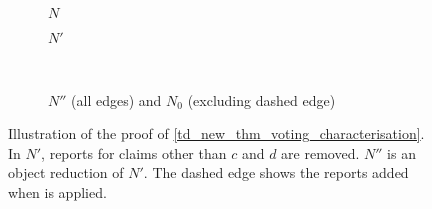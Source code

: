 \begin{figure}
    \centering
    \begin{subfigure}{.4\textwidth}
        \centering
        \caption{$N$}
    \end{subfigure}
    \begin{subfigure}{.4\textwidth}
        \centering
        \caption{$N'$}
    \end{subfigure}
    \\
    \begin{subfigure}{.9\textwidth}
        \centering
        \caption{
            $N''$ (all edges) and $N_0$ (excluding dashed edge)
        }
    \end{subfigure}
    \caption{
        Illustration of the proof of \cref{td_new_thm_voting_characterisation}.
        In $N'$, reports for claims other than $c$ and $d$ are removed. $N''$
        is an object reduction of $N'$. The dashed edge shows the reports added
        when \freshposresp{} is applied.
    }
    \label{td_new_fig_voting_characterisation_example}
\end{figure}

